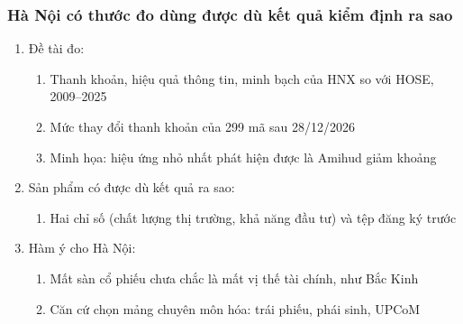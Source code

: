 \documentclass[11pt, xcolor={dvipsnames}, aspectratio=169, usepdftitle=false]{beamer}
\begin{document}
\begin{frame}
\frametitle{Hà Nội có thước đo dùng được dù kết quả kiểm định ra sao}
\begin{enumerate}
\item Đề tài đo:
\begin{enumerate}
\item Thanh khoản, hiệu quả thông tin, minh bạch của HNX so với HOSE, 2009--2025
\item Mức thay đổi thanh khoản của 299 mã sau 28/12/2026
\item Minh họa: hiệu ứng nhỏ nhất phát hiện được là Amihud giảm khoảng 
\end{enumerate}
\item Sản phẩm có được dù kết quả ra sao:
\begin{enumerate}
\item Hai chỉ số (chất lượng thị trường, khả năng đầu tư) và tệp đăng ký trước
\end{enumerate}
\item Hàm ý cho Hà Nội:
\begin{enumerate}
\item Mất sàn cổ phiếu chưa chắc là mất vị thế tài chính, như Bắc Kinh
\item Căn cứ chọn mảng chuyên môn hóa: trái phiếu, phái sinh, UPCoM
\end{enumerate}
\end{enumerate}
\end{frame}
\end{document}
